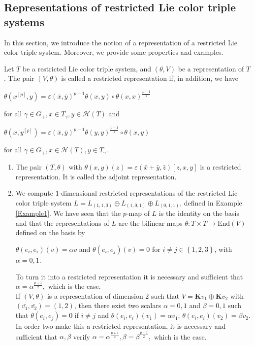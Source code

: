 \documentclass[11pt, twoside]{article}
\begin{document}
\subsection{Representations of restricted Lie color triple systems}
In this section, we introduce the notion of a representation of a restricted Lie color triple system. Moreover, we provide some properties and examples.
\begin{defi}\label{d5.11}
    Let $T$ be a restricted Lie color triple system, and $(\theta,V)$ be a representation of $T$. The pair $(V,\theta)$ is called a restricted representation if, in addition, we have
    \begin{center}
    $\theta(x^{[p]},y)=\varepsilon(\bar{x},\bar{y})^{p-1}\theta(x,y) \circ \theta(x,x)^{\frac{p-1}{2}} $ 
    \end{center} for all $\gamma\in G_+, x\in T_\gamma, y\in \mathcal{H}(T) $ and
    \begin{center} 
    $\theta(x,y^{[p]})=\varepsilon(\bar{x},\bar{y})^{p-1} \theta(y,y)^{\frac{p-1}{2}}\circ\theta(x,y) $
    \end{center} for all $\gamma\in G_+, x\in \mathcal{H}(T), y\in T_\gamma  $.
\end{defi}



\begin{ex}
\begin{enumerate}
    \item  The pair $(T,\theta)$ with $\theta(x,y)(z)=\varepsilon(\bar{x}+\bar{y},\bar{z})[z,x,y] $ is a restricted representation. It is called the adjoint representation.

   \item We compute  $1$-dimensional restricted representations of the restricted Lie color triple system $L=L_{(1,1,0)}\oplus L_{(1,0,1)} \oplus L_{(0,1,1)} $, defined in Example \ref{Example1}. We have seen that the $p$-map of $L$ is the identity on the basis and that the representations of $L$ are the bilinear maps $\theta:T\times T\to \mathrm{End}(V) $ defined on the basis by \begin{center}
          $\theta(e_i,e_i)(v)= \alpha v  $   and $\theta(e_i,e_j)(v)=0 $  for $i\neq j \in \left\{1,2,3 \right\}$, with $\alpha=0,1 $. 
    \end{center}To turn it into a restricted representation it is necessary and sufficient that $\alpha= \alpha^{\frac{p+1}{2}}, $ which is the case.\\ If $(V,\theta) $ is a representation of dimension $2$ such that $V=\mathbf{K}v_1\oplus \mathbf{K}v_2 $ with $(\bar{v_1},\bar{v_2})=(1,2) $, then there exist two scalars $\alpha=0,1$ and $\beta=0,1 $ such that $\theta(e_i,e_j)=0 $ if $i\neq j$ and $\theta(e_i,e_i)(v_1)=\alpha v_1 $, $\theta(e_i,e_i)(v_2)=\beta v_2 $. In order two make this a restricted representation, it is necessary and sufficient that $\alpha,\beta $ verify $\alpha= \alpha^{\frac{p+1}{2}}, \beta= \beta^{\frac{p+1}{2}},  $ which is the case.
    \end{enumerate}
\end{ex}
\end{document}
